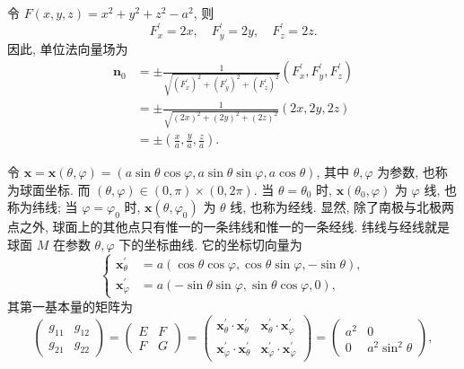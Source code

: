 \begin{solution}[解法 1]
令 $F(x,y,z) = x^{2} + y^{2} + z^{2} - a^{2}$, 则
\[
  F_{x}^{\prime} = 2x, \quad F_{y}^{\prime} = 2y, \quad F_{z}^{\prime} = 2z.
\]
因此, 单位法向量场为
\begin{align*}
  \boldsymbol{n}_{0} &= \pm\frac{1}{\sqrt{(F_{x}^{\prime})^{2} + (F_{y}^{\prime})^{2} + (F_{z}^{\prime})^{2}}}(F_{x}^{\prime}, F_{y}^{\prime}, F_{z}^{\prime}) \\
  &= \pm\frac{1}{\sqrt{(2x)^{2} + (2y)^{2} + (2z)^{2}}}(2x, 2y, 2z) \\
  &= \pm\left(\frac{x}{a}, \frac{y}{a}, \frac{z}{a}\right).
\end{align*}
\end{solution}

\begin{solution}[解法 2]
令 $\boldsymbol{x} = \boldsymbol{x}(\theta,\varphi) = (a\sin\theta\cos\varphi, a\sin\theta\sin\varphi, a\cos\theta)$, 其中 $\theta, \varphi$ 为参数, 也称为球面坐标. 而 $(\theta,\varphi) \in (0,\pi) \times (0,2\pi)$. 当 $\theta = \theta_{0}$ 时, $\boldsymbol{x}(\theta_{0},\varphi)$ 为 $\varphi$ 线, 也称为纬线; 当 $\varphi = \varphi_{0}$ 时, $\boldsymbol{x}(\theta,\varphi_{0})$ 为 $\theta$ 线, 也称为经线. 显然, 除了南极与北极两点之外, 球面上的其他点只有惟一的一条纬线和惟一的一条经线. 纬线与经线就是球面 $M$ 在参数 $\theta, \varphi$ 下的坐标曲线. 它的坐标切向量为
\[
  \left\{\begin{aligned}
    \boldsymbol{x}_{\theta}^{\prime} &= a(\cos\theta\cos\varphi, \cos\theta\sin\varphi, -\sin\theta), \\
    \boldsymbol{x}_{\varphi}^{\prime} &= a(-\sin\theta\sin\varphi, \sin\theta\cos\varphi, 0),
  \end{aligned}\right.
\]
其第一基本量的矩阵为
\[
  \begin{pmatrix} g_{11} & g_{12} \\ g_{21} & g_{22} \end{pmatrix} = \begin{pmatrix} E & F \\ F & G \end{pmatrix} = \begin{pmatrix} \boldsymbol{x}_{\theta}^{\prime} \cdot \boldsymbol{x}_{\theta}^{\prime} & \boldsymbol{x}_{\theta}^{\prime} \cdot \boldsymbol{x}_{\varphi}^{\prime} \\ \boldsymbol{x}_{\varphi}^{\prime} \cdot \boldsymbol{x}_{\theta}^{\prime} & \boldsymbol{x}_{\varphi}^{\prime} \cdot \boldsymbol{x}_{\varphi}^{\prime} \end{pmatrix} = \begin{pmatrix} a^{2} & 0 \\ 0 & a^{2}\sin^{2}\theta \end{pmatrix},
\]
\end{solution}
